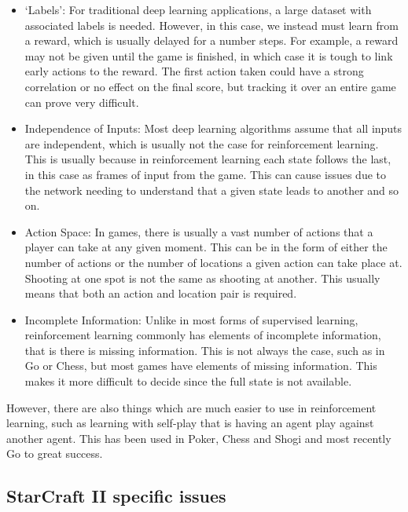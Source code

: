 \begin{itemize}
    \item `Labels': For traditional deep learning applications, a large dataset
        with associated labels is needed. However, in this case, we instead must
        learn from a reward, which is usually delayed for a number steps. For
        example, a reward may not be given until the game is finished, in which
        case it is tough to link early actions to the reward. The first
        action taken could have a strong correlation or no effect on the final
        score, but tracking it over an entire game can prove very difficult.
    \item Independence of Inputs: Most deep learning algorithms assume that
        all inputs are independent, which is usually not the case for
        reinforcement learning. This is usually because in reinforcement
        learning each state follows the last, in this case as frames of input
        from the game. This can cause issues due to the network needing to
        understand that a given state leads to another and so on.
    \item Action Space: In games, there is usually a vast number of actions that
        a player can take at any given moment. This can be in the form of either
        the number of actions or the number of locations a given action can
        take place at. Shooting at one spot is not the same as shooting at
        another. This usually means that both an action and location pair is
        required.
    \item Incomplete Information: Unlike in most forms of supervised learning,
        reinforcement learning commonly has elements of incomplete information,
        that is there is missing information. This is not always the case, such
        as in Go or Chess, but most games have elements of missing information.
        This makes it more difficult to decide since the full state is
        not available.
\end{itemize}

However, there are also things which are much easier to use in reinforcement
learning, such as learning with self-play that is having an agent play against
another agent. This has been used in Poker\cite{heinrich2016deep}, Chess and
Shogi\cite{silver2017mastering} and most recently
Go\cite{silver2016mastering,silver2017masteringgo} to great success.


\subsection{StarCraft II specific issues}

